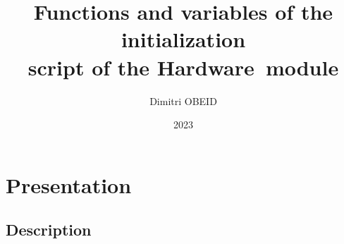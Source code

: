 \documentclass[a4paper,10pt]{article}
\title{\color{sec1}Functions and variables of the initialization \\script of the \color{sec2}Hardware\color{sec1}\ module}\color{text}
\author{Dimitri OBEID}
\date{2023}
\begin{document}
\maketitle
\newpage

\hypertarget{contents}{}
\tableofcontents
\newpage

\color{sec1}
\section{Presentation}\color{text}

\color{sec2}
\subsection{Description}\color{text}
\end{document}
